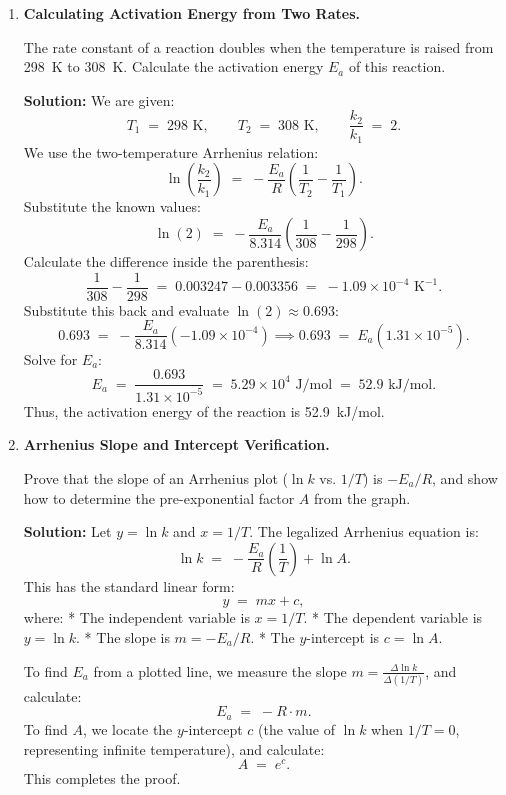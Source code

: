 \documentclass[12pt, a4paper]{book}
\begin{document}
\begin{problembox}
\begin{enumerate}[label=\textbf{E\arabic*.}]
  \item \textbf{Calculating Activation Energy from Two Rates.}
  
        The rate constant of a reaction doubles when the temperature is raised from \SI{298}{K} to \SI{308}{K}. Calculate the activation energy $E_a$ of this reaction.
        
        \textbf{Solution:}
        We are given:
        \[
          T_1 \;=\; 298 \text{ K}, \qquad T_2 \;=\; 308 \text{ K}, \qquad \frac{k_2}{k_1} \;=\; 2.
        \]
        We use the two-temperature Arrhenius relation:
        \[
          \ln\left( \frac{k_2}{k_1} \right) \;=\; -\frac{E_a}{R}\left( \frac{1}{T_2} - \frac{1}{T_1} \right).
        \]
        Substitute the known values:
        \[
          \ln(2) \;=\; -\frac{E_a}{8.314}\left( \frac{1}{308} - \frac{1}{298} \right).
        \]
        Calculate the difference inside the parenthesis:
        \[
          \frac{1}{308} - \frac{1}{298} \;=\; 0.003247 - 0.003356 \;=\; -1.09 \times 10^{-4} \text{ K}^{-1}.
        \]
        Substitute this back and evaluate $\ln(2) \approx 0.693$:
        \[
          0.693 \;=\; -\frac{E_a}{8.314} \left( -1.09 \times 10^{-4} \right) \implies 0.693 \;=\; E_a \left( 1.31 \times 10^{-5} \right).
        \]
        Solve for $E_a$:
        \[
          E_a \;=\; \frac{0.693}{1.31 \times 10^{-5}} \;=\; 5.29 \times 10^4 \text{ J/mol} \;=\; 52.9 \text{ kJ/mol}.
        \]
        Thus, the activation energy of the reaction is \SI{52.9}{kJ/mol}.
        
  \item \textbf{Arrhenius Slope and Intercept Verification.}
  
        Prove that the slope of an Arrhenius plot ($\ln k$ vs. $1/T$) is $-E_a/R$, and show how to determine the pre-exponential factor $A$ from the graph.
        
        \textbf{Solution:}
        Let $y = \ln k$ and $x = 1/T$. The legalized Arrhenius equation is:
        \[
          \ln k \;=\; -\frac{E_a}{R}\left(\frac{1}{T}\right) + \ln A.
        \]
        This has the standard linear form:
        \[
          y \;=\; m x + c,
        \]
        where:
        * The independent variable is $x = 1/T$.
        * The dependent variable is $y = \ln k$.
        * The slope is $m = -E_a/R$.
        * The $y$-intercept is $c = \ln A$.
        
        To find $E_a$ from a plotted line, we measure the slope $m = \frac{\Delta \ln k}{\Delta (1/T)}$, and calculate:
        \[
          E_a \;=\; -R \cdot m.
        \]
        To find $A$, we locate the $y$-intercept $c$ (the value of $\ln k$ when $1/T = 0$, representing infinite temperature), and calculate:
        \[
          A \;=\; e^c.
        \]
        This completes the proof.
\end{enumerate}
\end{problembox}
\end{document}

